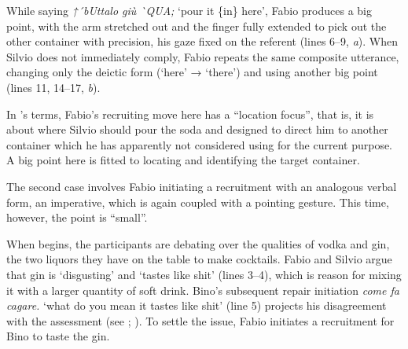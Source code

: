 \documentclass[output=paper,modfonts]{langscibook}
\begin{document}
While saying \textit{↑´{}bUttalo giù \`{}QUA;} ‘pour it \{in\} here’, Fabio produces a big point, with the arm stretched out and the finger fully extended to pick out the other container with precision, his gaze fixed on the referent (lines 6--9, \textit{a}). When Silvio does not immediately comply, Fabio repeats the same composite utterance, changing only the deictic form (‘here’ → ‘there’) and using another big point (lines 11, 14--17, \textit{b}).

In \citeauthor{EnfieldKitaRuiter2007}'s terms, Fabio's recruiting move here has a “location focus”, that is, it is about where Silvio should pour the soda and designed to direct him to another container which he has apparently not considered using for the current purpose. A big point here is fitted to locating and identifying the target container.

The second case involves Fabio initiating a recruitment with an analogous verbal form, an imperative, which is again coupled with a pointing gesture. This time, however, the point is “small”.

When  begins, the participants are debating over the qualities of vodka and gin, the two liquors they have on the table to make cocktails. Fabio and Silvio argue that gin is ‘disgusting’ and ‘tastes like shit’ (lines 3--4), which is reason for mixing it with a larger quantity of soft drink. Bino's subsequent repair initiation \textit{come fa cagare.} ‘what do you mean it tastes like shit’ (line 5) projects his disagreement with the assessment (see \citealt[279]{Rossi2015c}; \citealt{RaymondSidnell2019}). To settle the issue, Fabio initiates a recruitment for Bino to taste the gin.
\end{document}
